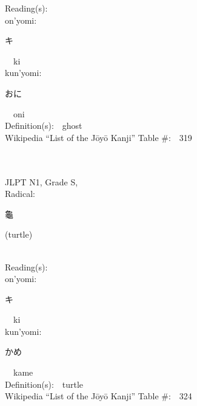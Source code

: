 \begin{multicols}{2}
Reading(s):\ \ \\
{\hspace*{1em}}on'yomi:\ \ \\
{\hspace*{2em}}{\begin{CJK}{UTF8}{min} キ \end{CJK}}\ \ ki\ \ \\
{\hspace*{1em}}kun'yomi:\ \ \\
{\hspace*{2em}}{\begin{CJK}{UTF8}{min} おに \end{CJK}}\ \ oni\ \ \\
Definition(s):\ \ ghost \\
Wikipedia ``List of the J\=oy\=o Kanji'' Table \#:\ \ 319 \\
\ \ \\
{\fontsize{34pt}{40pt}  }\ \ \\
{JLPT N1, Grade S, \\Radical:\ \ {\begin{CJK}{UTF8}{min} 龜 \end{CJK}} (turtle) } \\
Reading(s):\ \ \\
{\hspace*{1em}}on'yomi:\ \ \\
{\hspace*{2em}}{\begin{CJK}{UTF8}{min} キ \end{CJK}}\ \ ki\ \ \\
{\hspace*{1em}}kun'yomi:\ \ \\
{\hspace*{2em}}{\begin{CJK}{UTF8}{min} かめ \end{CJK}}\ \ kame\ \ \\
Definition(s):\ \ turtle \\
Wikipedia ``List of the J\=oy\=o Kanji'' Table \#:\ \ 324 \\
\ \ \\
{\fontsize{34pt}{40pt}  }\ \ \\  %

\end{multicols}
